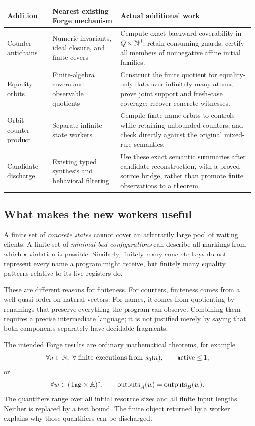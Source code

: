 \begin{longtable}{@{}>{\raggedright\arraybackslash}p{}>{\raggedright\arraybackslash}p{}>{\raggedright\arraybackslash}p{}@{}}
\toprule
Addition & Nearest existing Forge mechanism & Actual additional work \\
\midrule\endhead
Counter antichains & Numeric invariants, ideal closure, and finite covers &
Compute exact backward coverability in $Q\times\mathbb N^d$; retain consuming guards;
certify all members of nonnegative affine initial families. \\
Equality orbits & Finite-algebra covers and observable quotients &
Construct the finite quotient for equality-only data over infinitely many atoms;
prove joint support and fresh-case coverage; recover concrete witnesses. \\
Orbit--counter product & Separate infinite-state workers &
Compile finite name orbits to controls while retaining unbounded counters, and
check directly against the original mixed-rule semantics. \\
Candidate discharge & Existing typed synthesis and behavioral filtering &
Use these exact semantic summaries after candidate reconstruction, with a
proved source bridge, rather than promote finite observations to a theorem. \\
\bottomrule
\end{longtable}

\subsection{What makes the new workers useful}
A finite set of \emph{concrete states} cannot cover an arbitrarily large pool of
waiting clients. A finite set of \emph{minimal bad configurations} can describe
all markings from which a violation is possible. Similarly, finitely many
concrete keys do not represent every name a program might receive, but finitely
many equality patterns relative to its live registers do.

These are different reasons for finiteness. For counters, finiteness comes from
a well quasi-order on natural vectors. For names, it comes from quotienting by
renamings that preserve everything the program can observe. Combining them
requires a precise intermediate language; it is not justified merely by saying
that both components separately have decidable fragments.

The intended Forge results are ordinary mathematical theorems, for example
\[
 \forall n\in\mathbb N,\ \forall\text{ finite executions from }s_0(n),
 \qquad \mathrm{active}\le1,
\]
or
\[
 \forall w\in(\mathrm{Tag}\times\mathbb A)^*,
 \qquad \mathrm{outputs}_A(w)=\mathrm{outputs}_B(w).
\]
The quantifiers range over all initial resource sizes and all finite input
lengths. Neither is replaced by a test bound. The finite object returned by a
worker explains why those quantifiers can be discharged.

